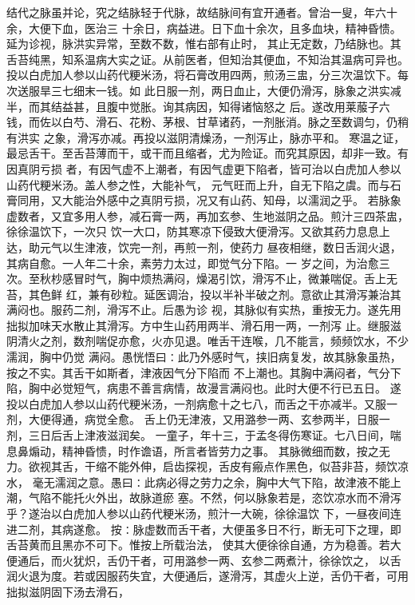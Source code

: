 \documentclass[a4paper,12pt,UTF8,twoside]{ctexbook}
\begin{document}
结代之脉虽并论，究之结脉轻于代脉，故结脉间有宜开通者。曾治一叟，年六十余，大便下血，医治三 
十余日，病益进。日下血十余次，且多血块，精神昏愦。延为诊视，脉洪实异常，至数不数，惟右部有止时， 
其止无定数，乃结脉也。其舌苔纯黑，知系温病大实之证。从前医者，但知治其便血，不知治其温病可异也。 
投以白虎加人参以山药代粳米汤，将石膏改用四两，煎汤三盅，分三次温饮下。每次送服旱三七细末一钱。如 
此日服一剂，两日血止，大便仍滑泻，脉象之洪实减半，而其结益甚，且腹中觉胀。询其病因，知得诸恼怒之 
后。遂改用莱菔子六钱，而佐以白芍、滑石、花粉、茅根、甘草诸药，一剂胀消。脉之至数调匀，仍稍有洪实 
之象，滑泻亦减。再投以滋阴清燥汤，一剂泻止，脉亦平和。 
寒温之证，最忌舌干。至舌苔薄而干，或干而且缩者，尤为险证。而究其原因，却非一致。有因真阴亏损 
者，有因气虚不上潮者，有因气虚更下陷者，皆可治以白虎加人参以山药代粳米汤。盖人参之性，大能补气， 
元气旺而上升，自无下陷之虞。而与石膏同用，又大能治外感中之真阴亏损，况又有山药、知母，以濡润之乎。 
若脉象虚数者，又宜多用人参，减石膏一两，再加玄参、生地滋阴之品。煎汁三四茶盅，徐徐温饮下，一次只 
饮一大口，防其寒凉下侵致大便滑泻。又欲其药力息息上达，助元气以生津液，饮完一剂，再煎一剂，使药力 
昼夜相继，数日舌润火退，其病自愈。一人年二十余，素劳力太过，即觉气分下陷。一 
岁之间，为治愈三次。至秋杪感冒时气，胸中烦热满闷，燥渴引饮，滑泻不止，微兼喘促。舌上无苔，其色鲜 
红，兼有砂粒。延医调治，投以半补半破之剂。意欲止其滑泻兼治其满闷也。服药二剂，滑泻不止。后愚为诊 
视，其脉似有实热，重按无力。遂先用拙拟加味天水散止其滑泻。方中生山药用两半、滑石用一两，一剂泻 
止。继服滋阴清火之剂，数剂喘促亦愈，火亦见退。唯舌干连喉，几不能言，频频饮水，不少濡润，胸中仍觉 
满闷。愚恍悟曰∶此乃外感时气，挟旧病复发，故其脉象虽热，按之不实。其舌干如斯者，津液因气分下陷而 
不上潮也。其胸中满闷者，气分下陷，胸中必觉短气，病患不善言病情，故漫言满闷也。此时大便不行已五日。 
遂投以白虎加人参以山药代粳米汤，一剂病愈十之七八，而舌之干亦减半。又服一剂，大便得通，病觉全愈。 
舌上仍无津液，又用潞参一两、玄参两半，日服一剂，三日后舌上津液滋润矣。 
一童子，年十三，于孟冬得伤寒证。七八日间，喘息鼻煽动，精神昏愦，时作谵语，所言者皆劳力之事。 
其脉微细而数，按之无力。欲视其舌，干缩不能外伸，启齿探视，舌皮有瘢点作黑色，似苔非苔，频饮凉水， 
毫无濡润之意。愚曰∶此病必得之劳力之余，胸中大气下陷，故津液不能上潮，气陷不能托火外出，故脉道瘀 
塞。不然，何以脉象若是，恣饮凉水而不滑泻乎？遂治以白虎加人参以山药代粳米汤，煎汁一大碗，徐徐温饮 
下，一昼夜间连进二剂，其病遂愈。 
按∶脉虚数而舌干者，大便虽多日不行，断无可下之理，即舌苔黄而且黑亦不可下。惟按上所载治法， 
使其大便徐徐自通，方为稳善。若大便通后，而火犹炽，舌仍干者，可用潞参一两、玄参二两煮汁，徐徐饮之， 
以舌润火退为度。若或因服药失宜，大便通后，遂滑泻，其虚火上逆，舌仍干者，可用拙拟滋阴固下汤去滑石， 
\end{document}
